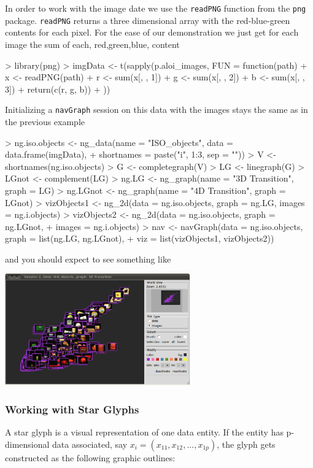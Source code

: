 \documentclass[12pt,oneside,titlepage,letter]{article}
\newcommand{\modify}[1]{{\color{blue}#1}}
\begin{document}
In order to work with the image date we use the \texttt{readPNG} function from the \texttt{png} package. \modify{\texttt{readPNG} returns a three dimensional array with the red-blue-green contents for each pixel. For the ease of our demonstration we just get for each image the sum of each, red,green,blue, content}
\begin{Schunk}
\begin{Sinput}
> library(png)
> imgData <- t(sapply(p.aloi_images, FUN = function(path) {
+     x <- readPNG(path)
+     r <- sum(x[, , 1])
+     g <- sum(x[, , 2])
+     b <- sum(x[, , 3])
+     return(c(r, g, b))
+ }))
\end{Sinput}
\end{Schunk}
Initializing a \texttt{navGraph} session on this data with the images stays the same as in the previous example
\begin{Schunk}
\begin{Sinput}
> ng.iso.objects <- ng_data(name = "ISO_objects", data = data.frame(imgData), 
+     shortnames = paste("i", 1:3, sep = ""))
> V <- shortnames(ng.iso.objects)
> G <- completegraph(V)
> LG <- linegraph(G)
> LGnot <- complement(LG)
> ng.LG <- ng_graph(name = "3D Transition", graph = LG)
> ng.LGnot <- ng_graph(name = "4D Transition", graph = LGnot)
> vizObjects1 <- ng_2d(data = ng.iso.objects, graph = ng.LG, images = ng.i.objects)
> vizObjects2 <- ng_2d(data = ng.iso.objects, graph = ng.LGnot, 
+     images = ng.i.objects)
> nav <- navGraph(data = ng.iso.objects, graph = list(ng.LG, ng.LGnot), 
+     viz = list(vizObjects1, vizObjects2))
\end{Sinput}
\end{Schunk}

and you should expect to see something like

\begin{center}
  \includegraphics[width = 0.6\textwidth]{img/tk2dImagesObject.png}
\end{center}

  
  
\subsubsection{Working with Star Glyphs}
A star glyph is a visual representation of one data entity. If the entity has p-dimensional data associated, say $x_{i} = (x_{11},x_{12},..., x_{1p})$, the glyph gets constructed as the following graphic outlines:
\end{document}
